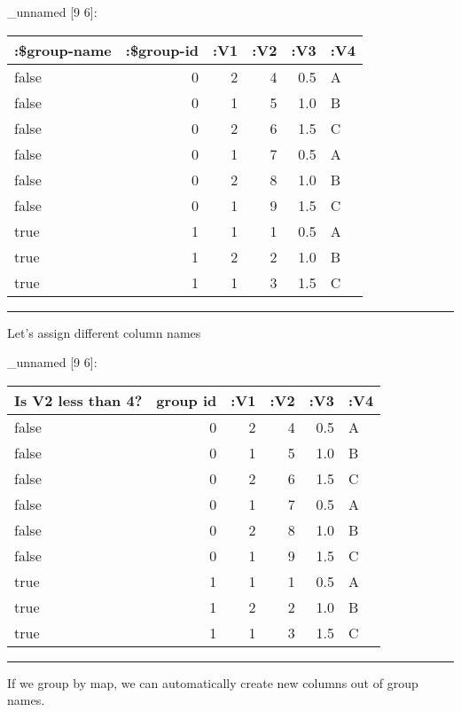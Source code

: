 \documentclass[]{article}
\newenvironment{Shaded}{\begin{snugshade}}{\end{snugshade}}
\newcommand{\KeywordTok}[1]{\textcolor[rgb]{0.13,0.29,0.53}{\textbf{#1}}}
\newcommand{\DecValTok}[1]{\textcolor[rgb]{0.00,0.00,0.81}{#1}}
\newcommand{\StringTok}[1]{\textcolor[rgb]{0.31,0.60,0.02}{#1}}
\newcommand{\VariableTok}[1]{\textcolor[rgb]{0.00,0.00,0.00}{#1}}
\newcommand{\AttributeTok}[1]{\textcolor[rgb]{0.77,0.63,0.00}{#1}}
\newcommand{\NormalTok}[1]{#1}
\begin{document}
\_unnamed {[}9 6{]}:

\begin{longtable}[]{@{}lrrrrl@{}}
\toprule
:\$group-name & :\$group-id & :V1 & :V2 & :V3 & :V4\tabularnewline
\midrule
\endhead
false & 0 & 2 & 4 & 0.5 & A\tabularnewline
false & 0 & 1 & 5 & 1.0 & B\tabularnewline
false & 0 & 2 & 6 & 1.5 & C\tabularnewline
false & 0 & 1 & 7 & 0.5 & A\tabularnewline
false & 0 & 2 & 8 & 1.0 & B\tabularnewline
false & 0 & 1 & 9 & 1.5 & C\tabularnewline
true & 1 & 1 & 1 & 0.5 & A\tabularnewline
true & 1 & 2 & 2 & 1.0 & B\tabularnewline
true & 1 & 1 & 3 & 1.5 & C\tabularnewline
\bottomrule
\end{longtable}

\begin{center}\rule{0.5\linewidth}{0.5pt}\end{center}

Let's assign different column names

\begin{Shaded}
\end{Shaded}

\_unnamed {[}9 6{]}:

\begin{longtable}[]{@{}lrrrrl@{}}
\toprule
Is V2 less than 4? & group id & :V1 & :V2 & :V3 & :V4\tabularnewline
\midrule
\endhead
false & 0 & 2 & 4 & 0.5 & A\tabularnewline
false & 0 & 1 & 5 & 1.0 & B\tabularnewline
false & 0 & 2 & 6 & 1.5 & C\tabularnewline
false & 0 & 1 & 7 & 0.5 & A\tabularnewline
false & 0 & 2 & 8 & 1.0 & B\tabularnewline
false & 0 & 1 & 9 & 1.5 & C\tabularnewline
true & 1 & 1 & 1 & 0.5 & A\tabularnewline
true & 1 & 2 & 2 & 1.0 & B\tabularnewline
true & 1 & 1 & 3 & 1.5 & C\tabularnewline
\bottomrule
\end{longtable}

\begin{center}\rule{0.5\linewidth}{0.5pt}\end{center}

If we group by map, we can automatically create new columns out of group
names.
\end{document}
